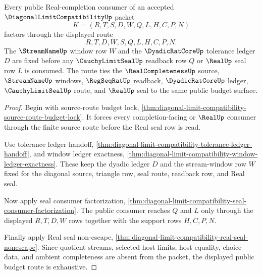 \begin{theorem}
\label{thm:diagonal-limit-compatibility-public-budget-route}
Every public Real-completion consumer of an accepted $\DiagonalLimitCompatibilityUp$ packet
$$
K=(R,T,S,D,W,Q,L,H,C,P,N)
$$
factors through the displayed route
$$
R,T,D,W,S,Q,L,H,C,P,N.
$$
The $\StreamNameUp$ window row $W$ and the $\DyadicRatCoreUp$ tolerance ledger $D$ are fixed before any $\CauchyLimitSealUp$ readback row $Q$ or $\RealUp$ seal row $L$ is consumed. The route ties the $\RealCompletenessUp$ source, $\StreamNameUp$ windows, $\RegSeqRatUp$ readback, $\DyadicRatCoreUp$ ledger, $\CauchyLimitSealUp$ route, and $\RealUp$ seal to the same public budget surface.
\end{theorem}
\begin{proof}
Begin with source-route budget lock, \autoref{thm:diagonal-limit-compatibility-source-route-budget-lock}. It forces every completion-facing or $\RealUp$ consumer through the finite source route before the Real seal row is read.

Use tolerance ledger handoff, \autoref{thm:diagonal-limit-compatibility-tolerance-ledger-handoff}, and window ledger exactness, \autoref{thm:diagonal-limit-compatibility-window-ledger-exactness}. These keep the dyadic ledger $D$ and the stream-window row $W$ fixed for the diagonal source, triangle row, seal route, readback row, and Real seal.

Now apply seal consumer factorization, \autoref{thm:diagonal-limit-compatibility-seal-consumer-factorization}. The public consumer reaches $Q$ and $L$ only through the displayed $R,T,D,W$ rows together with the support rows $H,C,P,N$.

Finally apply Real seal non-escape, \autoref{thm:diagonal-limit-compatibility-real-seal-nonescape}. Since quotient streams, selected host limits, host equality, choice data, and ambient completeness are absent from the packet, the displayed public budget route is exhaustive.
\end{proof}

